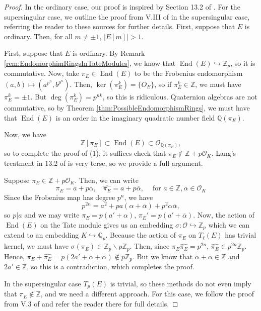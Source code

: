 \documentclass{amsart}
\theoremstyle{definition}
\theoremstyle{remark}
\numberwithin{equation}{section}
\newcommand{\cO}{\mathcal O}
\newcommand{\bbQ}{\mathbb Q}
\newcommand{\bbZ}{\mathbb Z}
\DeclareMathOperator{\End}{End}
\begin{document}
\begin{proof}
In the ordinary case, our proof is inspired by Section 13.2 of \cite{LangEF}.
For the supersingular case, we outline the proof from V.III of \cite{SilvermanAEC} in the supersingular case, referring the reader to these sources for further details.
First, suppose that $E$ is ordinary. Then, for all $m \neq \pm 1$, $|E[m]| > 1$. 

 First, suppose that $E$ is ordinary. By Remark \ref{rem:EndomorphimRingsInTateModules}, we know that $\End(E) \hookrightarrow \bbZ_{p}$, so it is commutative. Now, take $\pi_{E} \in \End(E)$ to be the Frobenius endomorphism $(a,b) \mapsto (a^{p^n}, b^{p^n})$. Then, $\ker(\pi_{E}^k) = \{O_{E}\}$, so if $\pi_{E}^k \in \bbZ$, we must have $\pi_{E}^{k} = \pm 1$. But $\deg(\pi_{E}^k) = p^{nk}$, so this is ridiculous. Quaternion algebras are not commutative, so by Theorem \ref{thm:PossibleEndomorphismRings}, we must have that $\End(E)$ is an order in the imaginary quadratic number field $\bbQ(\pi_{E})$.

Now, we have 
\[
 \bbZ[ \pi_{E}] \subset \End(E) \subset \cO_{\bbQ(\pi_{E})}, 
\]
so to complete the proof of (1), it suffices check that $\pi_{E} \notin \bbZ + p \cO_{K}$. Lang's treatment in 13.2 of \cite{LangEF} is very terse, so we provide a full argument. 

Suppose $\pi_{E} \in \bbZ + p \cO_{K}$. Then, we can write
\[
\pi_{E} = a + p \alpha, \ \ \ \ \widehat{\pi_{E}} = a + p \overline{\alpha}, \ \ \ \ \text{ for } a \in \bbZ, \alpha \in \cO_{K}
\]
Since the Frobenius map has degree $p^n$, we have
\[
p^{2n} = a^2 + p a (\alpha + \overline{\alpha}) + p^2 \alpha \overline{\alpha},
\]
so $p|a$ and we may write $\pi_{E} = p(a' + \alpha)$, $\pi_{E}' = p(a' + \overline{\alpha})$. Now, the action of $\End(E)$ on the Tate module gives us an embedding $\sigma: \cO \hookrightarrow {\bbZ_{p}}$ which we can extend to an embedding $K \hookrightarrow \bbQ_{p}$. Because the action of $\pi_{E}$ on $T_{\ell}(E)$ has trivial kernel, we must have $\sigma(\pi_{E}) \in \bbZ_{p} \smallsetminus p \bbZ_{p}$. Then, since $\pi_{E} \widehat{\pi_{E}} = p^{2n}$, $\widehat{\pi_{E}} \in p^{2n} \bbZ_{p}$. Hence, $\pi_{E} + \widehat{\pi_{E}} = p(2a' + \alpha + \overline{\alpha}) \notin p\bbZ_{p}$. But we know that $\alpha + \overline{\alpha} \in \bbZ$ and $2a' \in \bbZ$, so this is a contradiction, which completes the proof.

In the supersingular case $T_{p}(E)$ is trivial, so these methods do not even imply that $\pi_{E} \notin \bbZ$, and we need a different approach.
For this case, we follow the proof from V.3 of \cite{SilvermanAEC} and refer the reader there for full details.


\end{proof}
\end{document}
